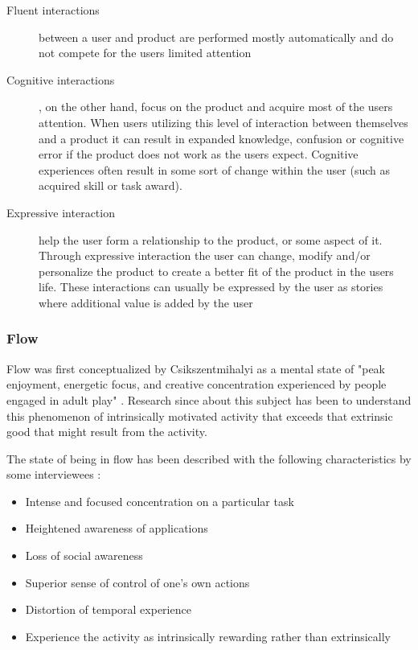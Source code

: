 \begin{description}
  \item[Fluent interactions] between a user and product are performed mostly automatically and do not compete for the users limited attention
  \item[Cognitive interactions], on the other hand, focus on the product and acquire most of the users attention. When users utilizing this level of interaction between themselves and a product it can result in expanded knowledge, confusion or cognitive error if the product does not work as the users expect. Cognitive experiences often result in some sort of change within the user (such as acquired skill or task award).
  \item[Expressive interaction] help the user form a relationship to the product, or some aspect of it. Through expressive interaction the user can change, modify and/or personalize the product to create a better fit of the product in the users life. These interactions can usually be expressed by the user as stories where additional value is added by the user
\end{description}

\subsubsection{Flow}
Flow was first conceptualized by Csikszentmihalyi as a mental state of "peak enjoyment, energetic focus, and creative concentration experienced by people engaged in adult play" \cite{Csikszentmihalyi1975}. Research since about this subject has been to understand this phenomenon of intrinsically motivated activity that exceeds that extrinsic good that might result from the activity.

The state of being in flow has been described with the following characteristics by some interviewees \cite{Nakamura2005}:

\begin{itemize}
  \item Intense and focused concentration on a particular task
  \item Heightened awareness of applications
  \item Loss of social awareness
  \item Superior sense of control of one's own actions
  \item Distortion of temporal experience
  \item Experience the activity as intrinsically rewarding rather than extrinsically
\end{itemize}


